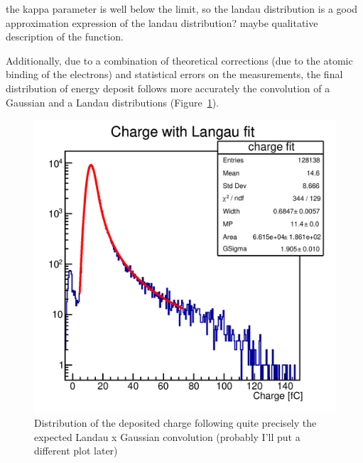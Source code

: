 the kappa parameter is well below the limit, so the landau distribution is a good approximation
expression of the landau distribution? maybe qualitative description of the function.

Additionally, due to a combination of theoretical corrections \cite{PhysRevA.11.1286} (due to the atomic binding of the electrons) and statistical errors on the measurements, the final distribution of energy deposit follows more accurately the convolution of a Gaussian and a Landau distributions (Figure~\ref{fig:langau_convolution_plot}).

\begin{figure}
    \centering
    \includegraphics[width=.6\linewidth]{Images/charge_plots/charge_data_all_cuts_401_S1_3_Charge_fit_ROOT_single_plot.png}
    \captionsetup{width=.8\linewidth}
    \caption{Distribution of the deposited charge following quite precisely the expected Landau x Gaussian convolution (probably I'll put a different plot later)}
    \label{fig:langau_convolution_plot}
\end{figure}

